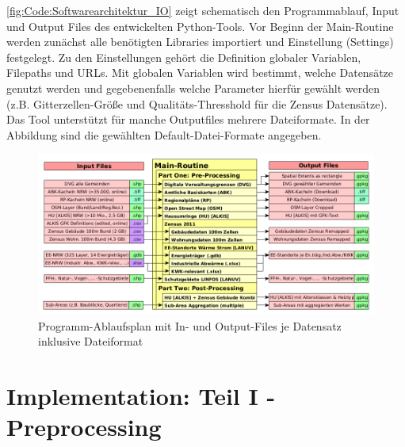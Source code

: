 		\autoref{fig:Code:Softwarearchitektur_IO} zeigt schematisch den Programmablauf, Input und Output Files des entwickelten Python-Tools. Vor Beginn der Main-Routine werden zunächst alle benötigten Libraries importiert und Einstellung (Settings) festgelegt. Zu den Einstellungen gehört die Definition globaler Variablen, Filepaths und URLs. Mit globalen Variablen wird bestimmt, welche Datensätze genutzt werden und gegebenenfalls welche Parameter hierfür gewählt werden (z.B. Gitterzellen-Größe und Qualitäts-Thresshold für die Zensus Datensätze). Das Tool unterstützt für manche Outputfiles mehrere Dateiformate. In der Abbildung sind die gewählten Default-Datei-Formate angegeben. 
		 
		\begin{figure}[H]
				\includegraphics[width=\linewidth]{Medien/own/Softwarearchitektur_IO.png}
				\caption{Programm-Ablaufsplan mit In- und Output-Files je Datensatz inklusive Dateiformat}
				\label{fig:Code:Softwarearchitektur_IO}
		\end{figure}


	\section{Implementation: Teil I - Preprocessing}
		\label{sec:Code:Implementation1}
		
